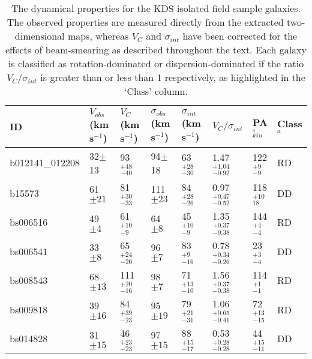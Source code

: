 \documentclass[fleqn,usenatbib]{mnras}
\begin{document}
\begin{table*}
\centering
\begin{threeparttable}
\caption{The dynamical properties for the KDS isolated field sample galaxies.
The observed properties are measured directly from the extracted two-dimensional maps, whereas $V_{C}$ and $\sigma_{int}$ have been corrected for the effects of beam-smearing as described throughout the text.
Each galaxy is classified as rotation-dominated or dispersion-dominated if the ratio $V_{C}/\sigma_{int}$ is greater than or less than 1 respectively, as highlighted in the `Class' column.}
\label{tab:kin_props}
\begin{tabular}{llllllll}

 \hline
ID & $V_{obs}$(km\,s$^{-1}$) & $V_{C}$(km\,s$^{-1}$) & $\sigma_{obs}$(km\,s$^{-1}$) & $\sigma_{int}$(km\,s$^{-1}$) & $V_{C}/\sigma_{int}$ & PA$_{kin}^{\circ}$ & Class$^{a}$ \\
 \hline
b012141\_012208 & 32$\pm$13                    & 93$^{+48}_{-40}$                     & 94$\pm$18                 & 63$^{+28}_{-30}$                 & 1.47$^{+1.04}_{-0.92}$             & 122$^{+9}_{-9}$ & RD   \\[1ex]
b15573          & 61$\pm21$                    & 81$^{+30}_{-33}$                     & 111$\pm23$                 & 84$^{+28}_{-26}$          & 0.97$^{+0.47}_{-0.52}$            & 118$^{+10}_{18}$ & DD   \\[1ex]
bs006516        & 49$\pm4$                    & 61$^{+10}_{-9}$                     & 64$\pm8$                  & 45$^{+10}_{-9}$              & 1.35$^{+0.37}_{-0.38}$         & 144$^{+4}_{-4}$ & RD   \\[1ex]
bs006541        & 33$\pm8$         & 65$^{+24}_{-20}$          & 96$\pm7$                  & 83$^{+9}_{-16}$             & 0.78$^{+0.34}_{-0.26}$          & 23$^{+3}_{-4}$ & DD    \\[1ex]
bs008543        & 68$\pm13$                    & 111$^{+20}_{-16}$                    & 98$\pm7$                  & 71$^{+13}_{-10}$         & 1.56$^{+0.37}_{-0.38}$                & 114$^{+1}_{-1}$  & RD  \\[1ex]
bs009818        & 39$\pm16$                    & 84$^{+39}_{-23}$                     & 95$\pm19$                  & 79$^{+21}_{-31}$       & 1.06$^{+0.65}_{-0.41}$                   & 72$^{+13}_{-15}$ & RD    \\[1ex]
bs014828        & 31$\pm15$                    & 46$^{+23}_{-23}$                     & 97$\pm15$                  & 88$^{+15}_{-17}$      & 0.53$^{+0.28}_{-0.28}$               & 44$^{+15}_{-11}$  & DD  \\[1ex]

\end{tabular}
\end{threeparttable}
\end{table*}
\end{document}
